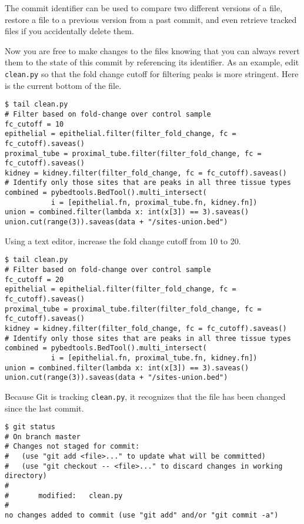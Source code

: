 The commit identifier can be used to compare two different versions of a file, restore a file to a previous version from a past commit, and even retrieve tracked files if you accidentally delete them.

Now you are free to make changes to the files knowing that you can always revert them to the state of this commit by referencing its identifier.
As an example, edit \verb|clean.py| so that the fold change cutoff for filtering peaks is more stringent.
Here is the current bottom of the file.

\begin{verbatim}
$ tail clean.py
# Filter based on fold-change over control sample
fc_cutoff = 10
epithelial = epithelial.filter(filter_fold_change, fc = fc_cutoff).saveas()
proximal_tube = proximal_tube.filter(filter_fold_change, fc = fc_cutoff).saveas()
kidney = kidney.filter(filter_fold_change, fc = fc_cutoff).saveas()
# Identify only those sites that are peaks in all three tissue types
combined = pybedtools.BedTool().multi_intersect(
           i = [epithelial.fn, proximal_tube.fn, kidney.fn])
union = combined.filter(lambda x: int(x[3]) == 3).saveas()
union.cut(range(3)).saveas(data + "/sites-union.bed")
\end{verbatim}

Using a text editor, increase the fold change cutoff from 10 to 20.

\begin{verbatim}
$ tail clean.py
# Filter based on fold-change over control sample
fc_cutoff = 20
epithelial = epithelial.filter(filter_fold_change, fc = fc_cutoff).saveas()
proximal_tube = proximal_tube.filter(filter_fold_change, fc = fc_cutoff).saveas()
kidney = kidney.filter(filter_fold_change, fc = fc_cutoff).saveas()
# Identify only those sites that are peaks in all three tissue types
combined = pybedtools.BedTool().multi_intersect(
           i = [epithelial.fn, proximal_tube.fn, kidney.fn])
union = combined.filter(lambda x: int(x[3]) == 3).saveas()
union.cut(range(3)).saveas(data + "/sites-union.bed")
\end{verbatim}

Because Git is tracking \verb|clean.py|, it recognizes that the file has been changed since the last commit.

\begin{verbatim}
$ git status
# On branch master
# Changes not staged for commit:
#   (use "git add <file>..." to update what will be committed)
#   (use "git checkout -- <file>..." to discard changes in working directory)
#
#       modified:   clean.py
#
no changes added to commit (use "git add" and/or "git commit -a")
\end{verbatim}

